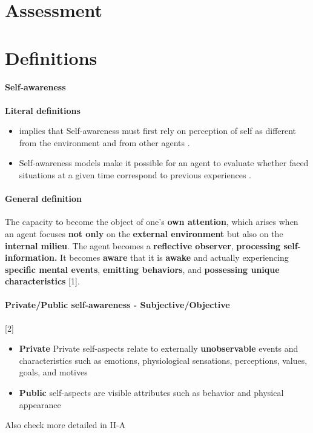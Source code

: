 \documentclass{article}
\begin{document}
	\section{Assessment}
		\citet{herbst-2017-metrics-and-benchmarks-for-self-aware-computing-systems}
		\citet{esterle-2017-assessing-self-awareness}
	\section{Definitions}
		\paragraph{Self-awareness}
		\textbf{Literal definitions}
		 \begin{itemize}
		 	\item implies that Self-awareness must first rely on perception of self as different from the environment and from other agents \cite{chatila-2018-toward-self-aware-robots}.
		 	\item Self-awareness models make it possible for an agent to evaluate whether faced situations at a given time correspond to
		 	previous experiences \cite{ravanbakhsh-2018-hierarchy-of-gans-for-learning-embodied-self-awareness-model}.
		 \end{itemize}
		
		\paragraph{General definition} The capacity to become the object of one’s \textbf{own attention}, which arises when an agent focuses \textbf{not only} on the \textbf{external environment} but also on the \textbf{internal milieu}. The agent becomes a \textbf{reflective observer}, \textbf{processing self-information.} It becomes \textbf{aware} that it is \textbf{awake} and actually experiencing \textbf{specific mental events}, \textbf{emitting behaviors}, and \textbf{possessing unique characteristics} \citet{regazzoni-2020-multi-sensorial-generative-and-descriptive-self-awareness-models-for-autonomous-systems}[1].
		
		\paragraph{Private/Public self-awareness - Subjective/Objective}  \citet{regazzoni-2020-multi-sensorial-generative-and-descriptive-self-awareness-models-for-autonomous-systems}[2]
			\begin{itemize}
				\item \textbf{Private} Private self-aspects relate to externally \textbf{unobservable} events and characteristics such as emotions, physiological sensations, perceptions, values, goals, and motives
				\item \textbf{Public} self-aspects are visible attributes such as behavior and physical appearance
			\end{itemize}
			Also check more detailed in \cite{lewis-2011-a-survey-of-self-awareness-and-its-application-in-computing-systems} II-A
\end{document}
